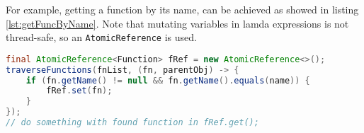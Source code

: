 \begin{appendix}
For example, getting a function by its name, can be achieved as showed in listing \ref{lst:getFuncByName}. \small Note that mutating variables in lamda expressions is not thread-safe, so an \texttt{AtomicReference} is used.

\begin{lstlisting}[language=Java,caption={get a function by its name},label=lst:getFuncByName]
final AtomicReference<Function> fRef = new AtomicReference<>();
traverseFunctions(fnList, (fn, parentObj) -> {
    if (fn.getName() != null && fn.getName().equals(name)) {
        fRef.set(fn);
    }
});
// do something with found function in fRef.get();
\end{lstlisting}

\end{appendix}